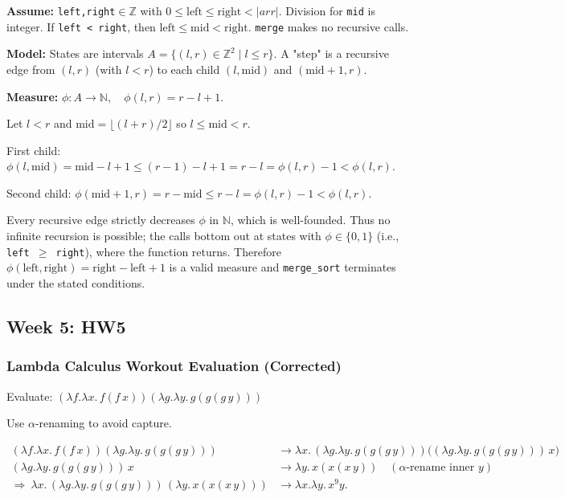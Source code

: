 \documentclass{article}
\theoremstyle{theorem}
\theoremstyle{definition}
\theoremstyle{remark}
\begin{document}
\textbf{Assume:} \texttt{left,right}$\in\mathbb{Z}$ with $0\le \text{left}\le \text{right}<|arr|$. Division for \texttt{mid} is integer. If \texttt{left < right}, then $\text{left}\le \text{mid}<\text{right}$. \texttt{merge} makes no recursive calls.

\textbf{Model:} States are intervals $A=\{(l,r)\in\mathbb Z^2\mid l\le r\}$. A "step" is a recursive edge from $(l,r)$ (with $l<r$) to each child $(l,\text{mid})$ and $(\text{mid}+1,r)$.

\textbf{Measure:} $\phi:A\to\mathbb N,\quad \phi(l,r)=r-l+1$.

Let $l<r$ and $\text{mid}=\lfloor(l+r)/2\rfloor$ so $l\le \text{mid}<r$.

First child: $\phi(l,\text{mid})=\text{mid}-l+1\le (r-1)-l+1=r-l=\phi(l,r)-1<\phi(l,r)$.

Second child: $\phi(\text{mid}+1,r)=r-\text{mid}\le r-l=\phi(l,r)-1<\phi(l,r)$.

Every recursive edge strictly decreases $\phi$ in $\mathbb N$, which is well-founded. Thus no infinite recursion is possible; the calls bottom out at states with $\phi\in\{0,1\}$ (i.e., \texttt{left $\geq$ right}), where the function returns. Therefore $\phi(\text{left},\text{right})=\text{right}-\text{left}+1$ is a valid measure and \texttt{merge\_sort} terminates under the stated conditions.

\subsection{Week 5: HW5}

\subsubsection{Lambda Calculus Workout Evaluation (Corrected)}

Evaluate: $(\lambda f.\lambda x.\,f(f\,x))(\lambda g.\lambda y.\,g(g(g\,y)))$

Use $\alpha$-renaming to avoid capture.

\[
\begin{aligned}
(\lambda f.\lambda x.\,f(f\,x))(\lambda g.\lambda y.\,g(g(g\,y)))
&\to \lambda x.\,(\lambda g.\lambda y.\,g(g(g\,y)))\big((\lambda g.\lambda y.\,g(g(g\,y)))\,x\big)\\
(\lambda g.\lambda y.\,g(g(g\,y)))\,x
&\to \lambda y.\,x(x(x\,y)) \quad (\text{$\alpha$-rename inner } y)\\
\Rightarrow\ \lambda x.\,(\lambda g.\lambda y.\,g(g(g\,y)))\,(\lambda y.\,x(x(x\,y)))
&\to \lambda x.\lambda y.\,x^9 y.
\end{aligned}
\]
\end{document}
